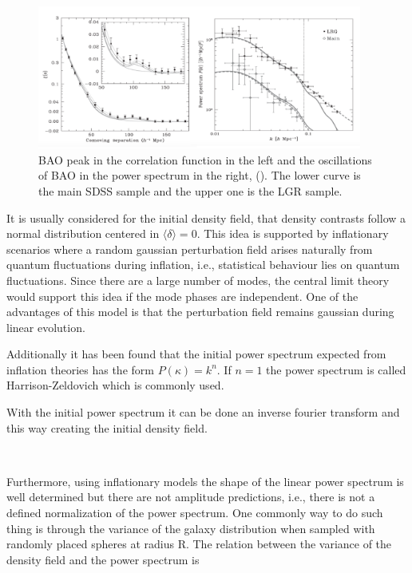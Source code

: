 \

\begin{figure}[htbp]
       \centering
               \includegraphics[width=0.95\textwidth]{./Images/chapter2/PS_CF.png}
       \caption{\small BAO peak in the correlation function in the left and the oscillations of BAO in the power spectrum in the right,
       (\cite{PLOT}).  
       The lower curve is the main SDSS sample and the upper one is the LGR sample. }
       \label{ps_cf}
 \end{figure}

It is usually considered for the initial density field, that density contrasts 
follow a normal distribution centered in $\langle \delta \rangle = 0$. This idea is supported by
inflationary scenarios where a random gaussian perturbation field arises naturally from quantum 
fluctuations during inflation, i.e., statistical behaviour lies on quantum fluctuations. 
Since there are a large number of modes, the central limit theory 
would support this idea if the mode phases are independent. 
One of the advantages of this model is that the perturbation field remains gaussian during linear evolution. 

Additionally it has been found that the initial power spectrum expected from inflation theories 
has the form $P(\kappa)= k^n$. If $n=1$ the power spectrum is called Harrison-Zeldovich which is 
commonly used. 

With the initial power spectrum it can be done an inverse fourier transform and this way creating the initial density field. 

\

Furthermore, using inflationary models the shape of the linear power spectrum is well 
determined but there are not amplitude predictions, i.e., there is not a defined 
normalization of the power spectrum. 
One commonly way to do such thing is through the variance of the galaxy distribution when
sampled with randomly placed spheres at radius R. The relation between the variance of the 
density field and the power spectrum is

